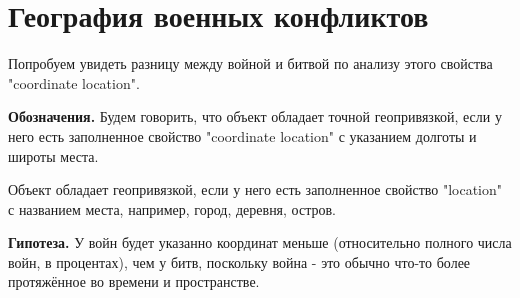 \section{География военных конфликтов}


Попробуем увидеть разницу между войной и битвой по анализу этого свойства "coordinate location".

\textbf{Обозначения.} Будем говорить, что объект обладает точной геопривязкой, если у него есть заполненное свойство "coordinate location" с указанием долготы и широты места.

Объект обладает геопривязкой, если у него есть заполненное свойство "location" с названием места, например, город, деревня, остров.

\textbf{Гипотеза.} У войн будет указанно координат меньше (относительно полного числа войн, в процентах), чем у битв, поскольку война - это обычно что-то более протяжённое во времени и пространстве.

